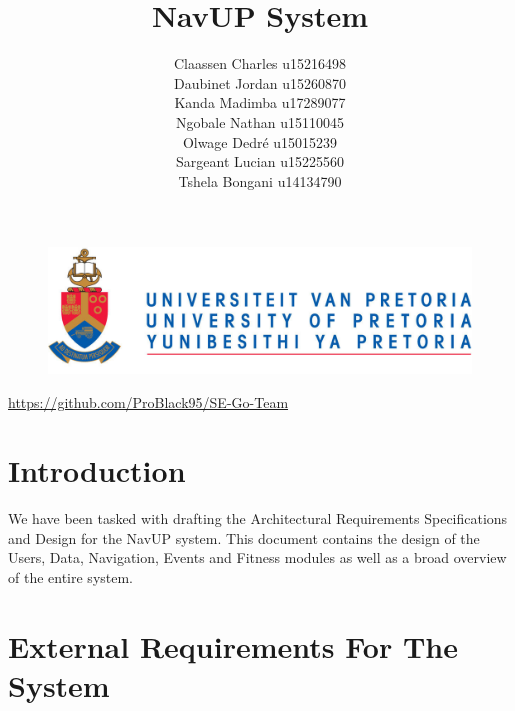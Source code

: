 \documentclass[a4paper, 12pt, one column]{article}
\begin{document}
\begin{figure}
		\includegraphics[width=\linewidth]{Images/logo.jpg}	
\end{figure}
    
\title{NavUP System}
\author{
				Claassen Charles u15216498\\
                Daubinet Jordan u15260870\\
                Kanda Madimba u17289077\\
                Ngobale Nathan u15110045\\
                Olwage Dedré u15015239\\
                Sargeant Lucian u15225560\\
                Tshela Bongani u14134790\\
        }
        
\maketitle
	\begin{center}
			\url{https://github.com/ProBlack95/SE-Go-Team}	
	\end{center}
	\newpage
    
\tableofcontents
\newpage

\section{Introduction}
We have been tasked with drafting the Architectural Requirements Specifications and Design for the NavUP system. This document contains the design of the Users, Data, Navigation, Events and Fitness modules as well as a broad overview of the entire system.

\section{External Requirements For The System}
\end{document}

